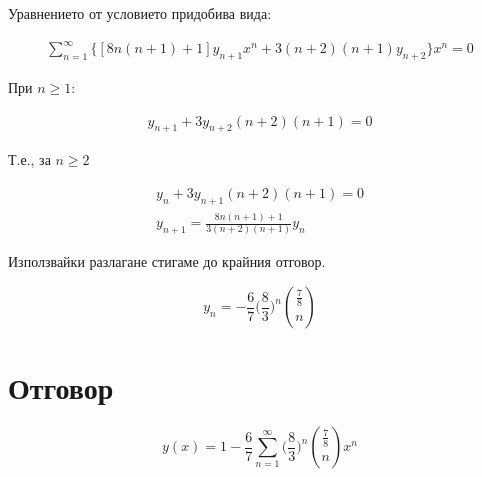 \documentclass{article}
\begin{document}
Уравнението от условието придобива вида:

\begin{gather*}
    \sum_{n=1}^\infty \{[8n(n+1) + 1]y_{n+1}x^n + 3(n+2)(n+1)y_{n+2}\}x^n = 0
\end{gather*}

При \( n \geq 1 \):

\begin{gather*}
    [8n(n+1) + 1]y_{n+1} + 3y_{n+2}(n+2)(n+1) = 0
\end{gather*}

Т.е., за \( n \geq 2 \)

\begin{gather*}
    [8n(n+1) + 1]y_{n} + 3y_{n+1}(n+2)(n+1) = 0 \\
    y_{n+1} = \frac{8n(n+1)+1}{3(n+2)(n+1)} y_n
\end{gather*}

Използвайки разлагане стигаме до крайния отговор.

\[
    y_n = - \frac{6}{7} \bigg(\frac{8}{3}\bigg)^n \binom{\frac{7}{8}}{n}
\]

\section*{Отговор}

\[
    y(x) = 1 - \frac{6}{7}\sum_{n=1}^{\infty} \bigg(\frac{8}{3}\bigg)^n \binom{\frac{7}{8}}{n} x^n
\]
\end{document}
